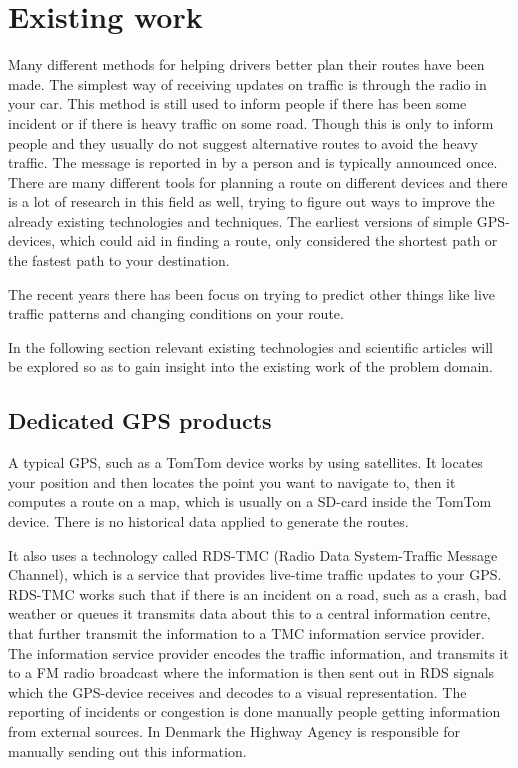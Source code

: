\section{Existing work}\label{sec:existingwork}
Many different methods for helping drivers better plan their routes have been made.
The simplest way of receiving updates on traffic is through the radio in your car. This method is still used to inform people if there has been some incident or if there is heavy traffic on some road. Though this is only to inform people and they usually do not suggest alternative routes to avoid the heavy traffic. The message is reported in by a person and is typically announced once.
There are many different tools for planning a route on different devices and there is a lot of research in this field as well, trying to figure out ways to improve the already existing technologies and techniques. The earliest versions of simple GPS-devices, which could aid in finding a route, only considered the shortest path or the fastest path to your destination.

The recent years there has been focus on trying to predict other things like live traffic patterns and changing conditions on your route.\cite{GoogleMapPrediction}

In the following section relevant existing technologies and scientific articles will be explored so as to gain insight into the existing work of the problem domain.
\subsection*{Dedicated GPS products}
A typical GPS, such as a TomTom device works by using satellites. It locates your position and then locates the point you want to navigate to, then it computes a route on a map, which is usually on a SD-card inside the TomTom device. There is no historical data applied to generate the routes.

It also uses a technology called RDS-TMC (Radio Data System-Traffic Message Channel), which is a service that provides live-time traffic updates to your GPS. RDS-TMC works such that if there is an incident on a road, such as a crash, bad weather or queues it transmits data about this to a central information centre, that further transmit the information to a TMC information service provider. The information service provider encodes the traffic information, and transmits it to a FM radio broadcast where the information is then sent out in RDS signals which the GPS-device receives and decodes to a visual representation. The reporting of incidents or congestion is done manually people getting information from external sources. In Denmark the Highway Agency is responsible for manually sending out this information\cite{Vejdirektorat}.

